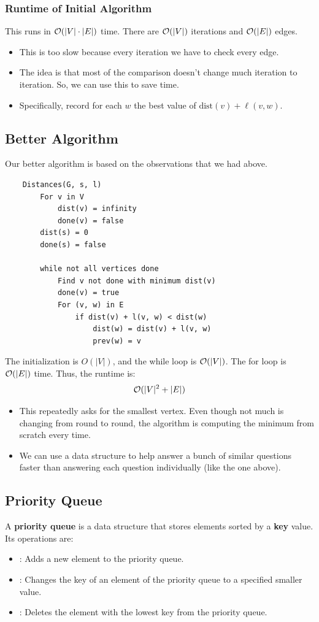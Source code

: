 \documentclass[letterpaper]{article}
\begin{document}
\subsubsection{Runtime of Initial Algorithm}
This runs in $\mathcal{O}(|V| \cdot |E|)$ time. There are $\mathcal{O}(|V|)$ iterations and $\mathcal{O}(|E|)$ edges.
\begin{itemize}
    \item This is too slow because every iteration we have to check every edge. 
    \item The idea is that most of the comparison doesn't change much iteration to iteration. So, we can use this to save time. 
    \item Specifically, record for each $w$ the best value of $\text{dist}(v) + \ell(v, w)$. 
\end{itemize}

\subsection{Better Algorithm}
Our better algorithm is based on the observations that we had above.
\begin{verbatim}
    Distances(G, s, l)
        For v in V 
            dist(v) = infinity 
            done(v) = false 
        dist(s) = 0
        done(s) = false 

        while not all vertices done 
            Find v not done with minimum dist(v)
            done(v) = true 
            For (v, w) in E 
                if dist(v) + l(v, w) < dist(w)
                    dist(w) = dist(v) + l(v, w)
                    prev(w) = v
\end{verbatim}
The initialization is $O(|V|)$, and the while loop is $\mathcal{O}(|V|)$. The for loop is $\mathcal{O}(|E|)$ time. Thus, the runtime is: 
\[\mathcal{O}(|V|^2 + |E|)\]
\begin{itemize}
    \item This repeatedly asks for the smallest vertex. Even though not much is changing from round to round, the algorithm is computing the minimum from scratch every time.
    \item We can use a data structure to help answer a bunch of similar questions faster than answering each question individually (like the one above).
\end{itemize}

\subsection{Priority Queue}
A \textbf{priority queue} is a data structure that stores elements sorted by a \textbf{key} value. Its operations are: 
\begin{itemize}
    \item {}: Adds a new element to the priority queue.
    \item {}: Changes the key of an element of the priority queue to a specified smaller value. 
    \item {}: Deletes the element with the lowest key from the priority queue. 
\end{itemize}
\end{document}
